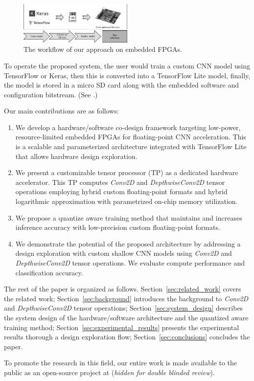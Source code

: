 \begin{figure}[t!]
	\centering
	\includegraphics[width=0.5\textwidth]{../figures/workflow.pdf}
	\caption{The workflow of our approach on embedded FPGAs.}
	\label{fig:workflow}
\end{figure}

To operate the proposed system, the user would train a custom CNN model using TensorFlow or Keras, then this is converted into a TensorFlow Lite model, finally, the model is stored in a micro SD card along with the embedded software and configuration bitstream. (See .)

Our main contributions are as follows:
\begin{enumerate}
	\item We develop a hardware/software co-design framework targeting low-power, resource-limited embedded FPGAs for floating-point CNN acceleration. This is a scalable and parameterized architecture integrated with TensorFlow Lite that allows hardware design exploration.
	\item We present a customizable tensor processor (TP) as a dedicated hardware accelerator. This TP computes \emph{Conv2D} and \emph{DepthwiseConv2D} tensor operations employing hybrid custom floating-point formats and hybrid logarithmic approximation with parametrized on-chip memory utilization.
	\item We propose a quantize aware training method that maintains and increases inference accuracy with low-precision custom floating-point formats.
	\item We demonstrate the potential of the proposed architecture by addressing a design exploration with custom shallow CNN models using \emph{Conv2D} and \emph{DepthwiseConv2D} tensor operations. We evaluate compute performance and classification accuracy.
\end{enumerate}

The rest of the paper is organized as follows. Section~\ref{sec:related_work} covers the related work; Section~\ref{sec:background} introduces the background to \emph{Conv2D} and \emph{DepthwiseConv2D} tensor operations; Section~\ref{sec:system_design} describes the system design of the hardware/software architecture and the quantized aware training method; Section~\ref{sec:experimental_results} presents the experimental results thorough a design exploration flow; Section~\ref{sec:conclusions} concludes the paper.

To promote the research in this field, our entire work is made available to the public as an open-source project at (\emph{hidden for double blinded review}).